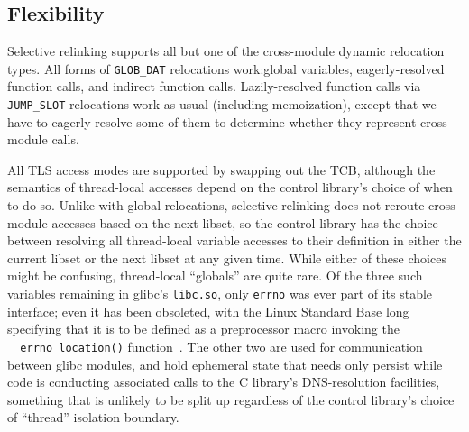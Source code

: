 \subsection{Flexibility}
\label{sec:limits}

Selective relinking supports all but one of the cross-module dynamic relocation
types.  All forms of \texttt{GLOB\_DAT} relocations work:\@ global variables,
eagerly-resolved function calls, and indirect function calls.  Lazily-resolved
function calls via \texttt{JUMP\_SLOT} relocations work as usual (including
memoization), except that we have to eagerly resolve some of them to determine
whether they represent cross-module calls.

All TLS access modes are supported by swapping out the TCB, although the semantics of
thread-local accesses depend on the control library's choice of when to do so.
Unlike with global relocations, selective relinking does not reroute cross-module
accesses based on the next libset, so the control library has the choice between
resolving all thread-local variable accesses to their definition in either the
current libset or the next libset at any given time.  While either of these choices
might be confusing, thread-local ``globals'' are quite rare.  Of the three such
variables remaining in glibc's \texttt{libc.so}, only \texttt{errno} was ever part of
its stable interface; even it has been obsoleted, with the Linux Standard Base long
specifying that it is to be defined as a preprocessor macro invoking the
\texttt{\_\_errno\_location()} function~\cite{www-lsb-errno}.  The other two are used
for communication between glibc modules, and hold ephemeral state that needs only
persist while code is conducting associated calls to the C library's DNS-resolution
facilities, something that is unlikely to be split up regardless of the control
library's choice of ``thread'' isolation boundary.


